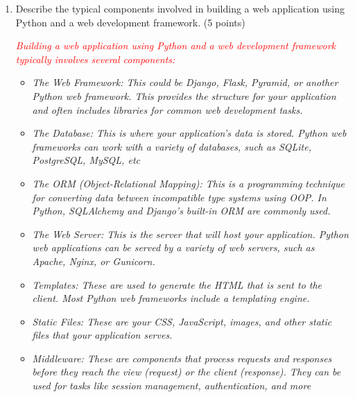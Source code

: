 \documentclass{article}
\begin{document}
\begin{enumerate}
         \item Describe the typical components involved in building a web application
         using Python and a web development framework. (5 points) \par
         \textcolor{red}{\textit{Building a web application using Python and a web development framework typically involves several components:}}
         \begin{itemize}
            \color{red}
            \item \textit{The Web Framework: This could be Django, Flask, Pyramid, or another Python web framework. 
            This provides the structure for your application and often includes libraries for common web development tasks.}
            \item \textit{The Database: This is where your application's data is stored. Python web frameworks can work with a variety of databases, 
            such as SQLite, PostgreSQL, MySQL, etc}
            \item \textit{The ORM (Object-Relational Mapping): This is a programming technique for converting 
            data between incompatible type systems using OOP. 
            In Python, SQLAlchemy and Django's built-in ORM are commonly used.}
            \item \textit{The Web Server: This is the server that will host your application. 
            Python web applications can be served by a variety of web servers, such as Apache, Nginx, or Gunicorn. }
            \item \textit{Templates: These are used to generate the HTML that is sent to the client. 
            Most Python web frameworks include a templating engine.}
            \item \textit{Static Files: These are your CSS, JavaScript, images, and other static files that your application serves.}
            \item \textit{Middleware: These are components that process requests and responses before they reach the view (request) or the client (response). 
            They can be used for tasks like session management, authentication, and more}
         \end{itemize}


\end{enumerate}
\end{document}
